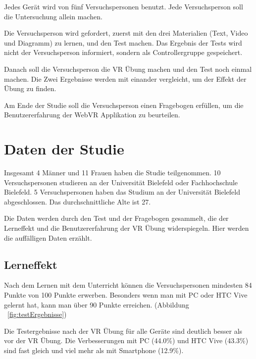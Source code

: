 Jedes Gerät wird von fünf Versuchspersonen benutzt. Jede Versuchsperson soll die Untersuchung allein machen.

Die Versuchsperson wird gefordert, zuerst mit den drei Materialien (Text, Video und Diagramm) zu lernen, und den Test machen. Das Ergebnis der Tests wird nicht der Versuchsperson informiert, sondern als Controllergruppe gespeichert.

Danach soll die Versuchsperson die VR Übung machen und den Test noch einmal machen. Die Zwei Ergebnisse werden mit einander vergleicht, um der Effekt der Übung zu finden.

Am Ende der Studie soll die Versuchsperson einen Fragebogen erfüllen, um die Benutzererfahrung der WebVR Applikation zu beurteilen.

\section{Daten der Studie}

Insgesamt 4 Männer und 11 Frauen haben die Studie teilgenommen. 10 Versuchspersonen studieren an der Universität Bielefeld oder Fachhochschule Bielefeld. 5 Versuchspersonen haben das Studium an der Universität Bielefeld abgeschlossen. Das durchschnittliche Alte ist 27.

Die Daten werden durch den Test und der Fragebogen gesammelt, die der Lerneffekt und die Benutzererfahrung der VR Übung widerspiegeln. Hier werden die auffälligen Daten erzählt.

\subsection{Lerneffekt}

Nach dem Lernen mit dem Unterricht können die Versuchspersonen mindesten 84 Punkte von 100 Punkte erwerben. Besonders wenn man mit PC oder HTC Vive gelernt hat, kann man über 90 Punkte erreichen. (Abbildung ~\ref{fig:testErgebnisse})

Die Testergebnisse nach der VR Übung für alle Geräte sind deutlich besser als vor der VR Übung. Die Verbesserungen mit PC (44.0\%) und HTC Vive (43.3\%) sind fast gleich und viel mehr als mit Smartphone (12.9\%).

